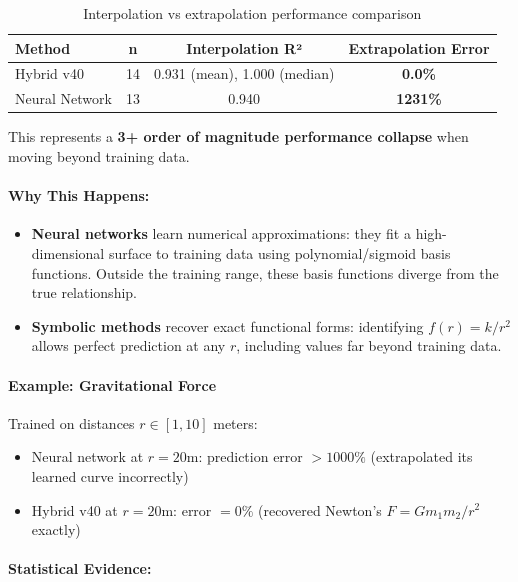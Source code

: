 \begin{table}[h]
\centering
\begin{tabular}{lccc}
\toprule
\textbf{Method} & \textbf{n} & \textbf{Interpolation R²} & \textbf{Extrapolation Error} \\
\midrule
Hybrid v40 & 14 & 0.931 (mean), 1.000 (median) & \textbf{0.0\%} \\
Neural Network & 13 & 0.940 & \textbf{1231\%} \\
\bottomrule
\end{tabular}
\caption{Interpolation vs extrapolation performance comparison}
\label{tab:interp_vs_extrap}
\end{table}

This represents a \textbf{3+ order of magnitude performance collapse} when moving beyond training data.

\paragraph{Why This Happens:}

\begin{itemize}
    \item \textbf{Neural networks} learn numerical approximations: they fit a high-dimensional surface to training data using polynomial/sigmoid basis functions. Outside the training range, these basis functions diverge from the true relationship.

    \item \textbf{Symbolic methods} recover exact functional forms: identifying $f(r) = k/r^2$ allows perfect prediction at any $r$, including values far beyond training data.
\end{itemize}

\paragraph{Example: Gravitational Force}

Trained on distances $r \in [1, 10]$ meters:
\begin{itemize}
    \item Neural network at $r = 20$m: prediction error $>1000\%$ (extrapolated its learned curve incorrectly)
    \item Hybrid v40 at $r = 20$m: error $= 0\%$ (recovered Newton's $F = Gm_1m_2/r^2$ exactly)
\end{itemize}

\paragraph{Statistical Evidence:}

